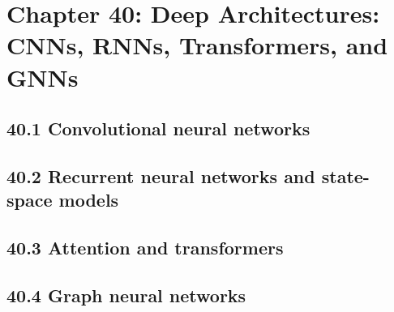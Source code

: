 \section{Chapter 40: Deep Architectures: CNNs, RNNs, Transformers, and GNNs}

\subsection{40.1 Convolutional neural networks}

\subsection{40.2 Recurrent neural networks and state-space models}

\subsection{40.3 Attention and transformers}

\subsection{40.4 Graph neural networks}

\clearpage

